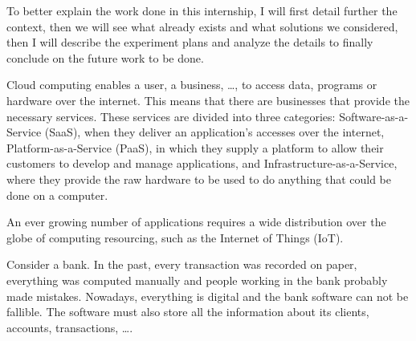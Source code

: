 To better explain the work done in this internship, I will first detail further the context, then we will see what already exists and what solutions we considered, then I will describe the experiment plans and analyze the details to finally conclude on the future work to be done.














\iffalse

\newpage


Cloud computing enables a user, a business, \dots, to access data, programs or hardware over the internet. This means that there are businesses that provide the necessary services. These services are divided into three categories: Software-as-a-Service (SaaS), when they deliver an application's accesses over the internet, Platform-as-a-Service (PaaS), in which they supply a platform to allow their customers to develop and manage applications, and Infrastructure-as-a-Service, where they provide the raw hardware to be used to do anything that could be done on a computer.

An ever growing number of applications requires a wide distribution over the globe of computing resourcing, such as the Internet of Things (IoT).







Consider a bank. In the past, every transaction was recorded on paper, everything was computed manually and people working in the bank probably made mistakes. Nowadays, everything is digital and the bank software can not be fallible. The software must also store all the information about its clients, accounts, transactions, \dots.


